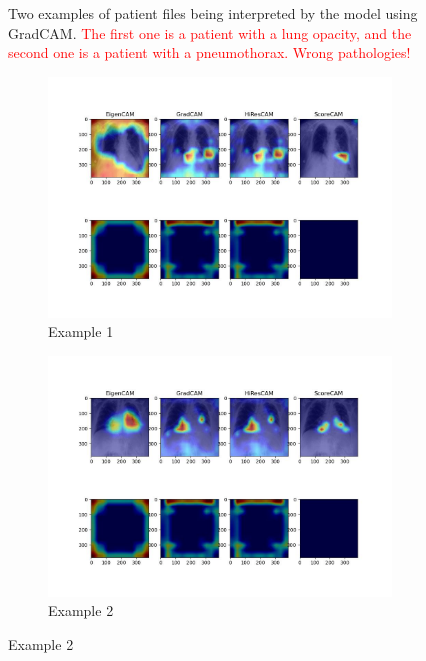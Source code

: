 \documentclass[11pt]{article}
\newcommand\myworries[1]{\textcolor{red}{#1}}
\begin{document}
\begin{figure}[H]
\begin{subfigure}[b]{\textwidth}
                 \end{subfigure}
                 \label{fig:gradcam_example_chexpert_4}
                 \caption{Two examples of patient files being interpreted by the model using GradCAM. \myworries{The first one is a patient with a lung opacity, and the second one is a patient with a pneumothorax. Wrong pathologies!}}

            \end{figure}


        \begin{figure}[H]
                 \centering
                 \begin{subfigure}[b]{\textwidth}
                     \centering
                     \includegraphics[width=\textwidth]{CheXpert2/inference/heatmaps_4.jpg}
                     \caption{Example 1}
                     \vspace{4ex}

                 \end{subfigure}
                 \hfill
                 \begin{subfigure}[b]{\textwidth}
                     \centering
                     \includegraphics[width=\textwidth]{CheXpert2/inference/heatmaps_7.jpg}
                     \caption{Example 2}
                     \vspace{4ex}


\end{subfigure}
\end{figure}
\end{document}
